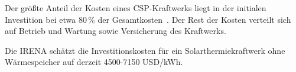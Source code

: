 Der größte Anteil der Kosten eines CSP-Kraftwerks liegt in der initialen Investition bei etwa 80\,\% der Gesamtkosten~\cite{irena2012}. Der Rest der Kosten verteilt sich auf Betrieb und Wartung sowie Versicherung des Kraftwerks.

Die IRENA schätzt die Investitionskosten für ein Solarthermiekraftwerk ohne Wärmespeicher auf derzeit 4500-7150 USD/kWh.
